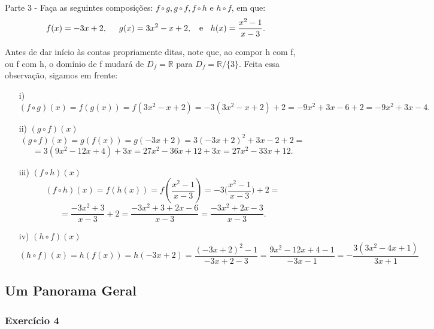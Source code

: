 \documentclass[exercícios_de_cálculo.tex]{subfiles}
\begin{document}
\paragraph{}Parte 3 - Faça as seguintes composições: $f\circ{g}, g\circ{f}, f\circ{h} \text{ e } h\circ{f}$, em que:
$$
	f(x) = -3x + 2, \hspace{0.5cm} g(x) = 3x^2 - x  + 2, \hspace{0.2cm} \text{ e } \hspace{0.2cm} h(x) = \frac{x^2 - 1}{x - 3}.
$$
\begin{sol*}
	Antes de dar início às contas propriamente ditas, note que, ao compor h com f, ou f com h, o dom\'inio de f mudará de $D_f = \mathbb{R}$ para $D_f = \mathbb{R}/\{3\}.$ Feita essa observação, sigamos em frente:
	\begin{itemize}
		\item[i)]$$(f\circ{g})(x) = f(g(x)) = f(3x^2 - x + 2) = -3(3x^2 - x + 2) + 2 = -9x^2 + 3x - 6 + 2 = -9x^2 + 3x - 4.$$
		\item[ii)]$(g\circ{f})(x)$
		      $$
			      (g\circ{f})(x) = g(f(x)) = g(-3x + 2) = 3(-3x + 2)^2 +3x - 2 + 2 =
		      $$
		      $$
			      = 3(9x^2 - 12x + 4) + 3x = 27x^2 - 36x + 12 + 3x = 27x^2 - 33x + 12.
		      $$
		\item[iii)]$(f\circ{h})(x)$
		      $$
			      (f\circ{h})(x) = f(h(x)) = f(\frac{x^2 - 1}{x - 3}) = -3\biggl(\frac{x^2 - 1}{x - 3}\biggr) + 2 =
		      $$
		      $$
			      = \frac{-3x^2 + 3}{x-3} + 2 = \frac{-3x^2 + 3 + 2x - 6}{x-3} = \frac{-3x^2 + 2x -3}{x-3}.
		      $$
		\item[iv)]$(h\circ{f})(x) $
		      $$
			      (h\circ{f})(x) = h(f(x)) = h(-3x + 2) = \frac{(-3x + 2)^2 - 1}{-3x+2 - 3} = \frac{9x^2 -12x + 4 - 1}{-3x -1} = -\frac{3(3x^2 - 4x + 1)}{3x+1}
		      $$
	\end{itemize}
	\qedsymbol
\end{sol*}
\subsection{Um Panorama Geral}
\subsubsection{Exercício 4}
\end{document}
